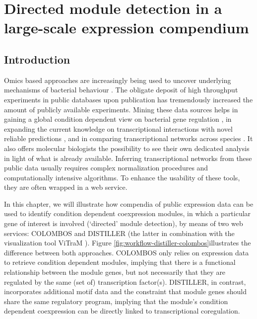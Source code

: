 \chapter{Directed module detection in a large-scale expression compendium}\label{ch:distiller}


\instructionsintroduction

\newcommand{\distsubparagraph}[1]{\hspace{-2mm}\textsf{\textbf{#1}}}


\section{Introduction}

Omics based approaches are increasingly being used to uncover underlying mechanisms of bacterial behaviour \cite{Fierro2008}. The obligate deposit of high throughput experiments in public databases upon publication has tremendously increased the amount of publicly available experiments. Mining these data sources helps in gaining a global condition dependent view on bacterial gene regulation \cite{Lemmens2009, Fadda2009}, in expanding the current knowledge on transcriptional interactions with novel reliable predictions \cite{Faith2007, Ernst2008}, and in comparing transcriptional networks across species \cite{Fierro2008, Babu2009}. It also offers molecular biologists the possibility to see their own dedicated analysis in light of what is already available. Inferring transcriptional networks from these public data usually requires complex normalization procedures \cite{Faith2008} and computationally intensive algorithms. To enhance the usability of these tools, they are often wrapped in a web service.

In this chapter, we will illustrate how compendia of public expression data can be used to identify condition dependent coexpression modules, in which a particular gene of interest is involved (`directed' module detection), by means of two web services: COLOMBOS \cite{Engelen2011} and DISTILLER \cite{Lemmens2009} (the latter in combination with the visualization tool ViTraM \cite{Sun2009}). Figure \ref{fig:workflow-distiller-colombos}illustrates the difference between both approaches. COLOMBOS only relies on expression data to retrieve condition dependent modules, implying that there is a functional relationship between the module genes, but not necessarily that they are regulated by the same (set of) transcription factor(s). DISTILLER, in contrast, incorporates additional motif data and the constraint that module genes should share the same regulatory program, implying that the module's condition dependent coexpression can be directly linked to transcriptional coregulation. 

